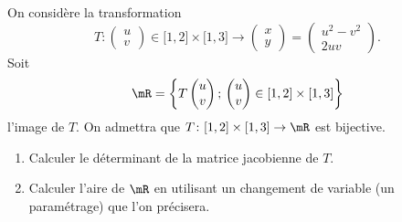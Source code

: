 
\begin{exercice}\label{exoOutilsMath-0119}

    On considère la transformation
    \begin{equation}
        T\colon \begin{pmatrix}
            u    \\ 
            v    
        \end{pmatrix}\in\mathopen[ 1 , 2 \mathclose]\times\mathopen[ 1 , 3 \mathclose]\to \begin{pmatrix}
            x    \\ 
            y    
        \end{pmatrix}=\begin{pmatrix}
            u^2-v^2    \\ 
            2uv    
        \end{pmatrix}.
    \end{equation}
    Soit
    \begin{equation}
        \mR=\left\{ T\begin{pmatrix}
            u    \\ 
            v    
        \end{pmatrix};\,\begin{pmatrix}
            u    \\ 
            v    
        \end{pmatrix}\in\mathopen[ 1 , 2 \mathclose]\times\mathopen[ 1 , 3 \mathclose]\right\}
    \end{equation}
    l'image de \( T\). On admettra que \( T\colon \mathopen[ 1 , 2 \mathclose]\times\mathopen[ 1 , 3 \mathclose]\to \mR\) est bijective.
    \begin{enumerate}
        \item
            Calculer le déterminant de la matrice jacobienne de \( T\).
        \item
            Calculer l'aire de \( \mR\) en utilisant un changement de variable (un paramétrage) que l'on précisera.
    \end{enumerate}
    

\end{exercice}
